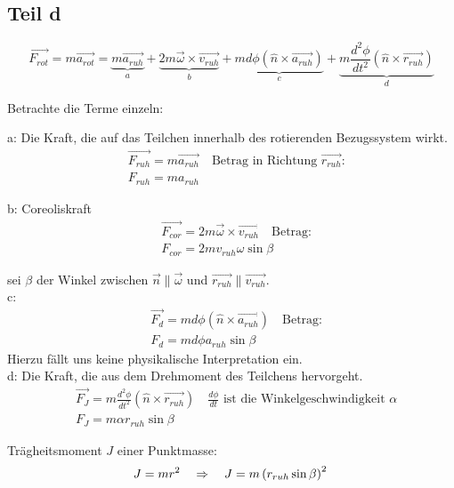 \documentclass[a4paper,german,12pt,smallheadings]{scrartcl}
\begin{document}
\subsection*{Teil d}

\begin{equation*}
\vec{F_{rot}}=m\vec{a_{rot}}=\underbrace{m\vec{a_{ruh}}}_{a}+\underbrace{2m\vec{\omega}\times\vec{v_{ruh}}}_{b}+\underbrace{md\phi\left(\hat{n}\times\vec{a_{ruh}}\right)}_{c}+\underbrace{m\frac{d^2\phi}{dt^2}\left(\hat{n}\times\vec{r_{ruh}}\right)}_{d}
\end{equation*}

Betrachte die Terme einzeln:

a:  Die Kraft, die auf das Teilchen innerhalb des rotierenden Bezugssystem wirkt.
\begin{align*}
& \vec{F_{ruh}}=m\vec{a_{ruh}}\quad \text{Betrag in Richtung $\vec{r_{ruh}}$:}\\
& F_{ruh}=ma_{ruh}
\end{align*}

b: Coreoliskraft
\begin{align*}
& \vec{F_{cor}}=2m\vec{\omega}\times\vec{v_{ruh}}\quad \text{Betrag:}\\
& F_{cor}=2mv_{ruh}\omega\sin\beta
\end{align*}

sei $\beta$ der Winkel zwischen $\vec{n}\parallel\vec{\omega}$ und $\vec{r_{ruh}}\parallel\vec{v_{ruh}}$.\\

c: 
\begin{align*}
& \vec{F_d}=md\phi\left(\hat{n}\times\vec{a_{ruh}}\right) \quad \text{Betrag:}\\
& F_d=md\phi a_{ruh}\sin\beta
\end{align*}
Hierzu fällt uns keine physikalische Interpretation ein.\\

d: Die Kraft, die aus dem Drehmoment des Teilchens hervorgeht.
\begin{align*}
& \vec{F_J}=m\frac{d^2\phi}{dt^2}\left(\hat{n}\times\vec{r_{ruh}}\right)\quad \text{$\frac{d\phi}{dt}$ ist die Winkelgeschwindigkeit $\alpha$}\\
& F_J=m\alpha r_{ruh}\sin\beta
\end{align*}

Trägheitsmoment $J$ einer Punktmasse:
\begin{equation*}
J=mr^2 \quad \Rightarrow \quad J=m\left(r_{ruh}\sin\beta\right)^2\\
\end{equation*}
\end{document}
